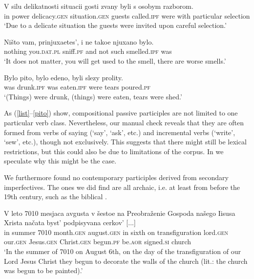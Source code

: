 \documentclass[output=paper,modfonts,newtxmath,hidelinks]{langscibook}
\begin{document}
\ea\gll	V silu delikatnosti situacii gosti zvany byli s osobym razborom. \label{zvany}\\
	in power delicacy.\textsc{gen} situation.\textsc{gen} guests called.\textsc{ipf} were with particular selection\\
\glt	`Due to a delicate situation the guests were invited upon careful selection.'
\z

\ea\gll	Ništo vam, prinjuxaetes', i ne takoe njuxano bylo. \label{njuxano}\\ 
	nothing you.\textsc{dat}.\textsc{pl} sniff.\textsc{pf} and not such smelled.\textsc{ipf} was\\
\glt	`It does not matter, you will get used to the smell, there are worse smells.'
\z

\ea\gll	Bylo pito, bylo edeno, byli slezy prolity. \label{pito}\\
	was drunk.\textsc{ipf} was eaten.\textsc{ipf} were tears poured.\textsc{pf}\\
\glt	`(Things) were drunk, (things) were eaten, tears were shed.'
\z

\noindent As (\ref{list}--\ref{pito}) show, compositional   passive participles are not limited to one particular verb class. Nevertheless, our manual check reveals that they are often formed from verbs of saying (`say', `ask', etc.) and incremental verbs (`write', `sew', etc.), though not exclusively. This suggests that there might still be lexical restrictions, but this could also be due to limitations of the corpus. In  we speculate why this might be the case. 

We furthermore found no contemporary participles derived from secondary imperfectives. The ones we did find are all archaic, i.e. at least from before the 19th century, such as the biblical . 

\ea\gll	V leto 7010 mesjaca avgusta v šestoe na Preobraženie Gospoda našego Iisusa Xrista načata byst' podpisyvana cerkov' [...] \label{7010} \\
	in summer 7010 month.\textsc{gen} august.\textsc{gen} in sixth on transfiguration lord.\textsc{gen} our.\textsc{gen} Jesus.\textsc{gen} Christ.\textsc{gen} begun.\textsc{pf} be.\textsc{aor} signed.\textsc{si} church \\ 
\glt    `In the summer of 7010 on August 6th, on the day of the transfiguration of our Lord Jesus Christ they begun to decorate the walls of the church (lit.: the church was begun to be painted).'
\z
\end{document}
